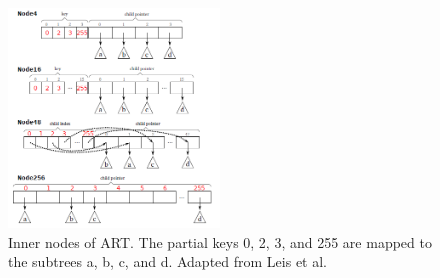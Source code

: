 \documentclass[conference]{IEEEtran}
\begin{document}
\begin{figure}
	\includegraphics[width=0.5\textwidth]{figure_4.png}
	\caption{Inner nodes of ART. The partial keys 0, 2, 3, and 255 are mapped to the subtrees a, b, c, and d. Adapted from Leis et al. \cite{b4}}
	\label{fig}
\end{figure}
\end{document}
